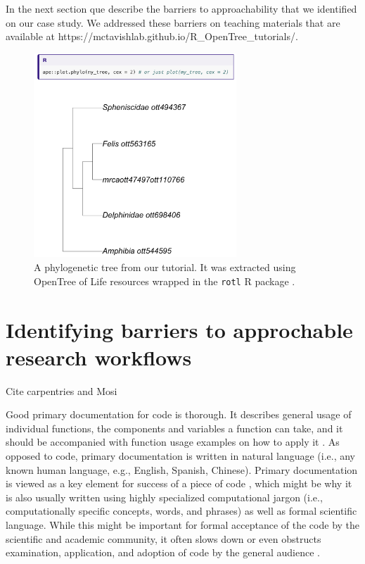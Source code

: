 \documentclass[12pt]{article}
\begin{document}
In the next section que describe the barriers to approachability that we identified
on our case study. We addressed these barriers on teaching materials that are
available at
https://mctavishlab.github.io/R\_OpenTree\_tutorials/.



\begin{figure}
\begin{center}
\includegraphics[width=3in]{fig-tree.png}
\end{center}
\caption{A phylogenetic tree from our tutorial. It was extracted using OpenTree of Life resources \citep{opentreeoflife2019synth} wrapped in the \texttt{rotl} R package \citep{michonneau2016rotl}. \label{fig:tree}}
\end{figure}

\section*{Identifying barriers to approchable research workflows}
\label{sec:identifying}


Cite carpentries and Mosi

Good primary documentation for code is thorough. It describes general usage of individual functions,
the components and variables a function can take, and it should be accompanied with
function usage examples on how to apply it \citep{karimzadeh2018top}.
As opposed to code, primary documentation is written in natural language (i.e.,
any known human language, e.g., English, Spanish, Chinese).
Primary documentation is viewed as a key element for success of a piece of code
\citep{karimzadeh2018top},
which might be why it is also usually written using highly specialized computational jargon (i.e., computationally specific concepts,
words, and phrases) as well as formal scientific language.
While this might be important for formal acceptance of the code by the scientific
and academic community, it often slows down or even
obstructs examination, application, and adoption of code by the general audience \citep{ball2017its}.
\end{document}
